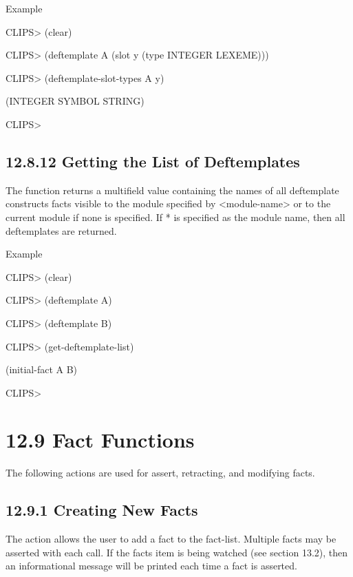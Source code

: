 \documentclass[letterpaper,10pt,english]{sphinxmanual}
\begin{document}
Example

CLIPS\textgreater{} (clear)

CLIPS\textgreater{} (deftemplate A (slot y (type INTEGER LEXEME)))

CLIPS\textgreater{} (deftemplate-slot-types A y)

(INTEGER SYMBOL STRING)

CLIPS\textgreater{}


\subsection{12.8.12 Getting the List of Deftemplates}
\label{\detokenize{actions:getting-the-list-of-deftemplates}}
The function  returns a multifield value
containing the names of all deftemplate constructs facts visible to the
module specified by \textless{}module-name\textgreater{} or to the current module if none is
specified. If * is specified as the module name, then all deftemplates
are returned.


\begin{sphinxVerbatim}[commandchars=\\\{\}]
 \PYG{p}{[}\PYG{p}{]}
\end{sphinxVerbatim}

Example

CLIPS\textgreater{} (clear)

CLIPS\textgreater{} (deftemplate A)

CLIPS\textgreater{} (deftemplate B)

CLIPS\textgreater{} (get-deftemplate-list)

(initial-fact A B)

CLIPS\textgreater{}


\section{12.9 Fact Functions}
\label{\detokenize{actions:fact-functions}}
The following actions are used for assert, retracting, and modifying
facts.


\subsection{12.9.1 Creating New Facts}
\label{\detokenize{actions:creating-new-facts}}
The  action allows the user to add a fact to the fact-list.
Multiple facts may be asserted with each call. If the facts item is
being watched (see section 13.2), then an informational message will be
printed each time a fact is asserted.
\end{document}
